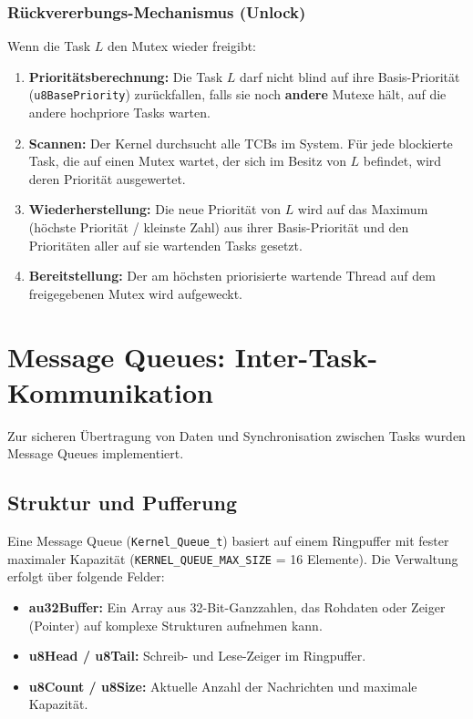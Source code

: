 \documentclass[11pt,a4paper]{article}
\begin{document}
\subsubsection{Rückvererbungs-Mechanismus (Unlock)}
Wenn die Task $L$ den Mutex wieder freigibt:
\begin{enumerate}
    \item \textbf{Prioritätsberechnung:} Die Task $L$ darf nicht blind auf ihre Basis-Priorität (\texttt{u8BasePriority}) zurückfallen, falls sie noch \textbf{andere} Mutexe hält, auf die andere hochpriore Tasks warten.
    \item \textbf{Scannen:} Der Kernel durchsucht alle TCBs im System. Für jede blockierte Task, die auf einen Mutex wartet, der sich im Besitz von $L$ befindet, wird deren Priorität ausgewertet.
    \item \textbf{Wiederherstellung:} Die neue Priorität von $L$ wird auf das Maximum (höchste Priorität / kleinste Zahl) aus ihrer Basis-Priorität und den Prioritäten aller auf sie wartenden Tasks gesetzt.
    \item \textbf{Bereitstellung:} Der am höchsten priorisierte wartende Thread auf dem freigegebenen Mutex wird aufgeweckt.
\end{enumerate}

\section{Message Queues: Inter-Task-Kommunikation}
Zur sicheren Übertragung von Daten und Synchronisation zwischen Tasks wurden Message Queues implementiert.

\subsection{Struktur und Pufferung}
Eine Message Queue (\texttt{Kernel\_Queue\_t}) basiert auf einem Ringpuffer mit fester maximaler Kapazität (\texttt{KERNEL\_QUEUE\_MAX\_SIZE} = 16 Elemente).
Die Verwaltung erfolgt über folgende Felder:
\begin{itemize}
    \item \textbf{au32Buffer:} Ein Array aus 32-Bit-Ganzzahlen, das Rohdaten oder Zeiger (Pointer) auf komplexe Strukturen aufnehmen kann.
    \item \textbf{u8Head / u8Tail:} Schreib- und Lese-Zeiger im Ringpuffer.
    \item \textbf{u8Count / u8Size:} Aktuelle Anzahl der Nachrichten und maximale Kapazität.
\end{itemize}
\end{document}
